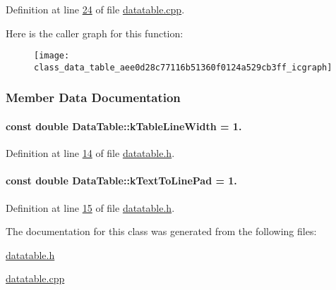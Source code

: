 Definition at line \hyperlink{datatable_8cpp_source_l00024}{24} of file \hyperlink{datatable_8cpp_source}{datatable.\+cpp}.



Here is the caller graph for this function\+:
\nopagebreak
\begin{figure}[H]
\begin{center}
\leavevmode
\texttt{[image: class\_data\_table\_aee0d28c77116b51360f0124a529cb3ff\_icgraph]}
\end{center}
\end{figure}




\subsubsection{Member Data Documentation}
\hypertarget{class_data_table_aa4aed4c624ca9a8e68c9ecc4d2b43458}{}
\paragraph[{k\+Table\+Line\+Width}]{\setlength{\rightskip}{0pt plus 5cm}const double Data\+Table\+::k\+Table\+Line\+Width = 1.\hspace{0.3cm}{\ttfamily [static]}}\label{class_data_table_aa4aed4c624ca9a8e68c9ecc4d2b43458}


Definition at line \hyperlink{datatable_8h_source_l00014}{14} of file \hyperlink{datatable_8h_source}{datatable.\+h}.

\hypertarget{class_data_table_ab0703eeee2cf6e45fc74356432434ac6}{}
\paragraph[{k\+Text\+To\+Line\+Pad}]{\setlength{\rightskip}{0pt plus 5cm}const double Data\+Table\+::k\+Text\+To\+Line\+Pad = 1.\hspace{0.3cm}{\ttfamily [static]}}\label{class_data_table_ab0703eeee2cf6e45fc74356432434ac6}


Definition at line \hyperlink{datatable_8h_source_l00015}{15} of file \hyperlink{datatable_8h_source}{datatable.\+h}.



The documentation for this class was generated from the following files\+:\begin{DoxyCompactItemize}
\item 
\hyperlink{datatable_8h}{datatable.\+h}\item 
\hyperlink{datatable_8cpp}{datatable.\+cpp}\end{DoxyCompactItemize}
